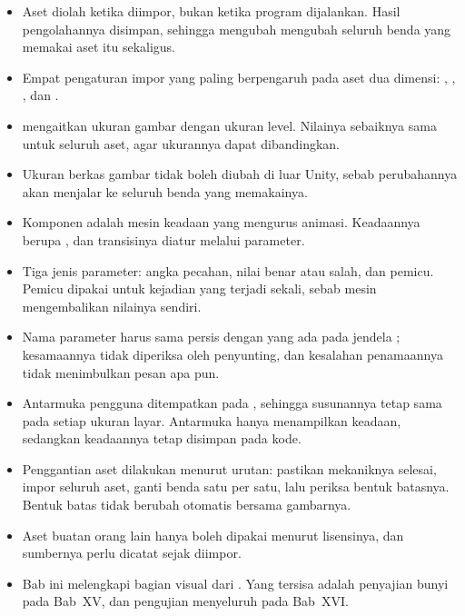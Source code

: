 
\begin{rangkumanbox}
\begin{itemize}
  \item Aset diolah ketika diimpor, bukan ketika program dijalankan. Hasil
        pengolahannya disimpan, sehingga mengubah 
        mengubah seluruh benda yang memakai aset itu sekaligus.
  \item Empat pengaturan impor yang paling berpengaruh pada aset dua dimensi:
        , , ,
        dan .
  \item {} mengaitkan ukuran gambar dengan ukuran level.
        Nilainya sebaiknya sama untuk seluruh aset, agar ukurannya dapat
        dibandingkan.
  \item Ukuran berkas gambar tidak boleh diubah di luar Unity, sebab
        perubahannya akan menjalar ke seluruh benda yang memakainya.
  \item Komponen  adalah mesin keadaan yang mengurus animasi.
        Keadaannya berupa , dan transisinya diatur
        melalui parameter.
  \item Tiga jenis parameter: angka pecahan, nilai benar atau salah, dan
        pemicu. Pemicu dipakai untuk kejadian yang terjadi sekali, sebab
        mesin mengembalikan nilainya sendiri.
  \item Nama parameter harus sama persis dengan yang ada pada jendela
        ; kesamaannya tidak diperiksa oleh penyunting, dan
        kesalahan penamaannya tidak menimbulkan pesan apa pun.
  \item Antarmuka pengguna ditempatkan pada , sehingga
        susunannya tetap sama pada setiap ukuran layar. Antarmuka hanya
        menampilkan keadaan, sedangkan keadaannya tetap disimpan pada kode.
  \item Penggantian aset dilakukan menurut urutan: pastikan mekaniknya selesai,
        impor seluruh aset, ganti benda satu per satu, lalu periksa bentuk
        batasnya. Bentuk batas tidak berubah otomatis bersama gambarnya.
  \item Aset buatan orang lain hanya boleh dipakai menurut lisensinya, dan
        sumbernya perlu dicatat sejak diimpor.
  \item Bab ini melengkapi bagian visual dari . Yang tersisa adalah
        penyajian bunyi pada Bab~XV, dan pengujian menyeluruh pada Bab~XVI.
\end{itemize}
\end{rangkumanbox}
